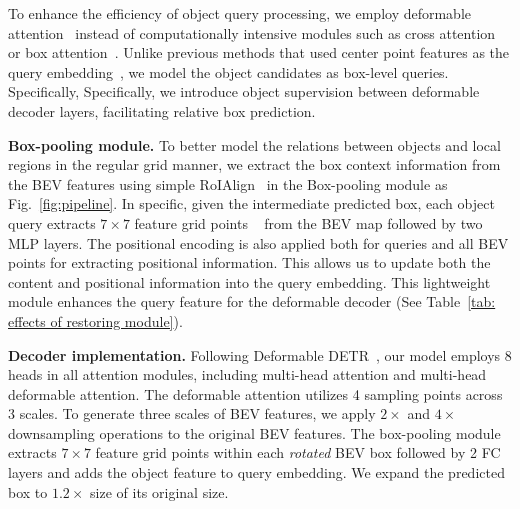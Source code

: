 \documentclass[10pt,twocolumn,letterpaper]{article}
\begin{document}
To enhance the efficiency of object query processing, we employ deformable attention~\cite{deformabledetr} instead of computationally intensive modules such as cross attention~\cite{detr} or box attention~\cite{nguyen2022boxer}. Unlike previous methods that used center point features as the query embedding~\cite{transfusion, efficientdetr}, we model the object candidates as box-level queries. Specifically, Specifically, we introduce object supervision between deformable decoder layers, facilitating relative box prediction.

\vspace{1mm}
\noindent\textbf{Box-pooling module.} To better model the relations between objects and local regions in the regular grid manner, we extract the box context information from the BEV features using simple RoIAlign~\cite{maskrcnn} in the Box-pooling module as Fig.~\ref{fig:pipeline}. In specific, given the intermediate predicted box, each object query extracts $7\times 7$ feature grid points ~\cite{maskrcnn} from the BEV map followed by two MLP layers. The positional encoding is also applied both for queries and all BEV points for extracting positional information. This allows us to update both the content and positional information into the query embedding. 
This lightweight module enhances the query feature for the deformable decoder (See Table~\ref{tab: effects of restoring module}).

\vspace{1mm}
\noindent\textbf{Decoder implementation.}
Following Deformable DETR~\cite{deformabledetr}, our model employs 8 heads in all attention modules, including multi-head attention and multi-head deformable attention. The deformable attention utilizes 4 sampling points across 3 scales. To generate three scales of BEV features, we apply $2\times$ and $4\times$ downsampling operations to the original BEV features. The box-pooling module extracts $7\times 7$ feature grid points within each \textit{rotated} BEV box followed by 2 FC layers and adds the object feature to query embedding. We expand the predicted box to $1.2\times$ size of its original size. 
\end{document}
